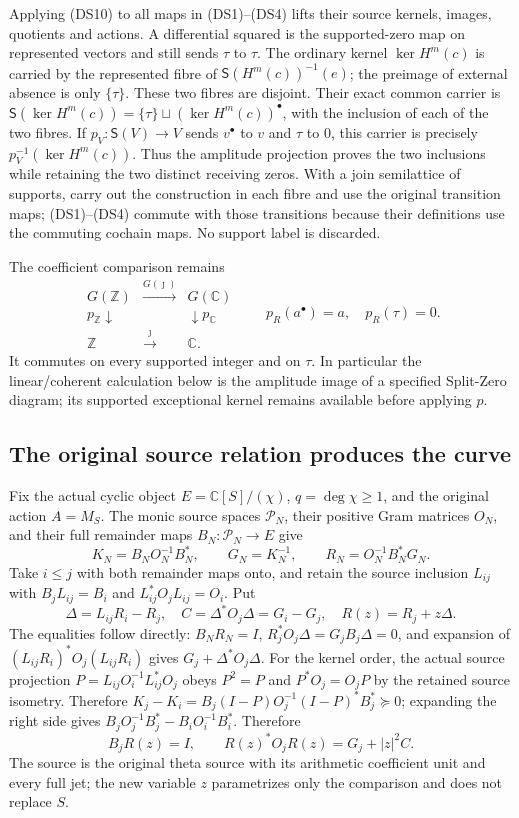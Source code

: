 \documentclass{article}
\begin{document}
Applying (DS10) to all maps in (DS1)--(DS4) lifts their source kernels,
images, quotients and actions.  A differential squared is the
supported-zero map on represented vectors and still sends $\tau$ to
$\tau$.  The ordinary kernel $\ker H^m(c)$ is carried by the
represented fibre of $\mathsf S(H^m(c))^{-1}(e)$; the preimage of
external absence is only $\{\tau\}$.  These two fibres are disjoint.
Their exact common carrier is
$\mathsf S(\ker H^m(c))=\{\tau\}\sqcup(\ker H^m(c))^\bullet$,
with the inclusion of each of the two fibres.  If
$p_V:\mathsf S(V)\to V$ sends $v^\bullet$ to $v$ and $\tau$ to
$0$, this carrier is precisely $p_V^{-1}(\ker H^m(c))$.
Thus the amplitude projection proves the two inclusions while
retaining the two distinct receiving zeros.  With a join semilattice
of supports, carry out the construction
in each fibre and use the original transition maps; (DS1)--(DS4) commute
with those transitions because their definitions use the commuting
cochain maps.  No support label is discarded.

The coefficient comparison remains
\[
 \begin{array}{ccc}
 G(\mathbb Z)&\xrightarrow{G(\jmath)}&G(\mathbb C)\\
 p_{\mathbb Z}\downarrow&&\downarrow p_{\mathbb C}\\
 \mathbb Z&\xrightarrow{\jmath}&\mathbb C.
 \end{array}\qquad
 p_R(a^\bullet)=a,\quad p_R(\tau)=0.
 \tag{DS11}
\]
It commutes on every supported integer and on $\tau$.  In particular
the linear/coherent calculation below is the amplitude image of a
specified Split-Zero diagram; its supported exceptional kernel remains
available before applying $p$.

\subsection{The original source relation produces the curve}

Fix the actual cyclic object $E=\mathbb C[S]/(\chi)$, $q=\deg\chi\geq1$,
and the original action $A=M_S$.  The monic source spaces
$\mathcal P_N$, their positive Gram matrices $O_N$, and their full
remainder maps $B_N:\mathcal P_N\to E$ give
\[
 K_N=B_NO_N^{-1}B_N^*,\qquad G_N=K_N^{-1},\qquad
 R_N=O_N^{-1}B_N^*G_N.
 \tag{DS12}
\]
Take $i\leq j$ with both remainder maps onto, and retain the source
inclusion $L_{ij}$ with
$B_jL_{ij}=B_i$ and $L_{ij}^*O_jL_{ij}=O_i$.  Put
\[
 \Delta=L_{ij}R_i-R_j,
 \quad C=\Delta^*O_j\Delta=G_i-G_j,
 \quad R(z)=R_j+z\Delta.
 \tag{DS13}
\]
The equalities follow directly: $B_NR_N=I$,
$R_j^*O_j\Delta=G_jB_j\Delta=0$, and expansion of
$(L_{ij}R_i)^*O_j(L_{ij}R_i)$ gives $G_j+\Delta^*O_j\Delta$.
For the kernel order, the actual source projection
$P=L_{ij}O_i^{-1}L_{ij}^*O_j$ obeys $P^2=P$ and
$P^*O_j=O_jP$ by the retained source isometry.  Therefore
$K_j-K_i=B_j(I-P)O_j^{-1}(I-P)^*B_j^*\succeq0$;
expanding the right side gives $B_jO_j^{-1}B_j^*-B_iO_i^{-1}B_i^*$.
Therefore
\[
 B_jR(z)=I,\qquad R(z)^*O_jR(z)=G_j+|z|^2C.
 \tag{DS14}
\]
The source is the original theta source with its arithmetic coefficient
unit and every full jet; the new variable $z$ parametrizes only the
comparison and does not replace $S$.
\end{document}
